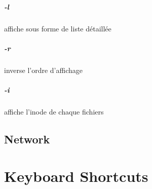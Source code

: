 \documentclass{report}
\begin{document}
\subsubsection{-l}
affiche sous forme de liste détaillée
\subsubsection{-r}
inverse l'ordre d'affichage
\subsubsection{-i}
affiche l’inode de chaque fichiers

\chapter{Network}

\part{Keyboard Shortcuts}
\end{document}
